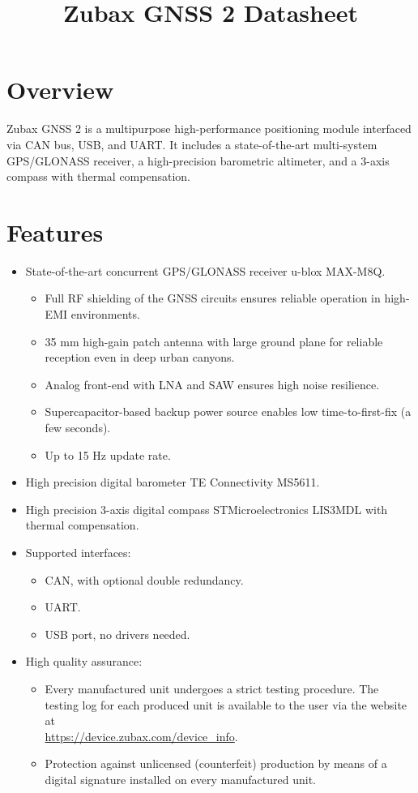 \documentclass{zubaxdoc}
\title{Zubax GNSS 2 Datasheet}
\begin{document}
\frontmatter

\begin{titlepage}

\section*{Overview}

Zubax GNSS 2 is a multipurpose high-performance positioning module interfaced via CAN bus, USB, and UART.
It includes a state-of-the-art multi-system GPS/\allowbreak{}GLONASS receiver,
a high-precision barometric altimeter, and a 3-axis compass with thermal compensation.

\section*{Features}

\begin{itemize}
    \item State-of-the-art concurrent GPS/GLONASS receiver u-blox MAX-M8Q.
    \begin{itemize}
    	\item Full RF shielding of the GNSS circuits ensures reliable operation in high-EMI environments.
    	\item 35 mm high-gain patch antenna with large ground plane for reliable reception even in deep urban canyons.
    	\item Analog front-end with LNA and SAW ensures high noise resilience.
    	\item Supercapacitor-based backup power source enables low time-to-first-fix (a few seconds).
    	\item Up to 15 Hz update rate.
    \end{itemize}
	\item High precision digital barometer TE Connectivity MS5611.
    \item High precision 3-axis digital compass STMicroelectronics LIS3MDL with thermal compensation.
	\item Supported interfaces:
    \begin{itemize}
        \item CAN, with optional double redundancy.
        \item UART.
        \item USB port, no drivers needed.
    \end{itemize}
    \item High quality assurance:
    \begin{itemize}
        \item Every manufactured unit undergoes a strict testing procedure.
        The testing log for each produced unit is available to the user via the website at\\
        \url{https://device.zubax.com/device_info}.
        \item Protection against unlicensed (counterfeit) production by means of a digital signature
        installed on every manufactured unit.
    \end{itemize}
\end{itemize}


\end{titlepage}
\end{document}
